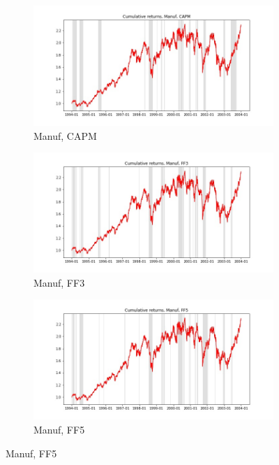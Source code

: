 \documentclass{article}
\begin{document}
 
  \begin{figure}
  \centering
  \begin{subfigure}[b]{0.3\textwidth}
    \centering
    \includegraphics[width=\textwidth]{Manuf/bwunif_full_cumrets_ofint_CAPM.jpg}
    \caption{Manuf, CAPM}
    \label{fig:1}
  \end{subfigure}
  \begin{subfigure}[b]{0.3\textwidth}
    \centering
    \includegraphics[width=\textwidth]{Manuf/bwunif_full_cumrets_ofint_FF3.jpg}
    \caption{Manuf, FF3}
    \label{fig:2}
  \end{subfigure}
    \begin{subfigure}[b]{0.3\textwidth}
    \centering
    \includegraphics[width=\textwidth]{Manuf/bwunif_full_cumrets_ofint_FF5.jpg}
    \caption{Manuf, FF5}
    \label{fig:1}
  \end{subfigure}
  \end{figure}
  
\end{document}
